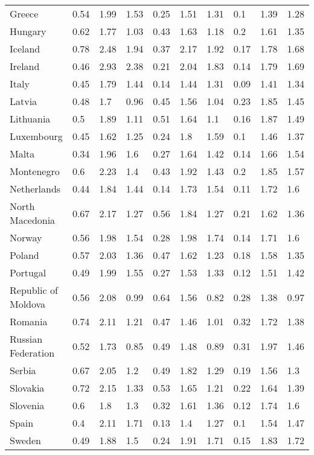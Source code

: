 \begin{longtable}[t]{llllllllll}
Greece & 0.54 & 1.99 & 1.53 & 0.25 & 1.51 & 1.31 & 0.1 & 1.39 & 1.28\\
Hungary & 0.62 & 1.77 & 1.03 & 0.43 & 1.63 & 1.18 & 0.2 & 1.61 & 1.35\\
Iceland & 0.78 & 2.48 & 1.94 & 0.37 & 2.17 & 1.92 & 0.17 & 1.78 & 1.68\\
Ireland & 0.46 & 2.93 & 2.38 & 0.21 & 2.04 & 1.83 & 0.14 & 1.79 & 1.69\\
Italy & 0.45 & 1.79 & 1.44 & 0.14 & 1.44 & 1.31 & 0.09 & 1.41 & 1.34\\
Latvia & 0.48 & 1.7 & 0.96 & 0.45 & 1.56 & 1.04 & 0.23 & 1.85 & 1.45\\
Lithuania & 0.5 & 1.89 & 1.11 & 0.51 & 1.64 & 1.1 & 0.16 & 1.87 & 1.49\\
Luxembourg & 0.45 & 1.62 & 1.25 & 0.24 & 1.8 & 1.59 & 0.1 & 1.46 & 1.37\\
Malta & 0.34 & 1.96 & 1.6 & 0.27 & 1.64 & 1.42 & 0.14 & 1.66 & 1.54\\
Montenegro & 0.6 & 2.23 & 1.4 & 0.43 & 1.92 & 1.43 & 0.2 & 1.85 & 1.57\\
Netherlands & 0.44 & 1.84 & 1.44 & 0.14 & 1.73 & 1.54 & 0.11 & 1.72 & 1.6\\
North Macedonia & 0.67 & 2.17 & 1.27 & 0.56 & 1.84 & 1.27 & 0.21 & 1.62 & 1.36\\
Norway & 0.56 & 1.98 & 1.54 & 0.28 & 1.98 & 1.74 & 0.14 & 1.71 & 1.6\\
Poland & 0.57 & 2.03 & 1.36 & 0.47 & 1.62 & 1.23 & 0.18 & 1.58 & 1.35\\
Portugal & 0.49 & 1.99 & 1.55 & 0.27 & 1.53 & 1.33 & 0.12 & 1.51 & 1.42\\
Republic of Moldova & 0.56 & 2.08 & 0.99 & 0.64 & 1.56 & 0.82 & 0.28 & 1.38 & 0.97\\
Romania & 0.74 & 2.11 & 1.21 & 0.47 & 1.46 & 1.01 & 0.32 & 1.72 & 1.38\\
Russian Federation & 0.52 & 1.73 & 0.85 & 0.49 & 1.48 & 0.89 & 0.31 & 1.97 & 1.46\\
Serbia & 0.67 & 2.05 & 1.2 & 0.49 & 1.82 & 1.29 & 0.19 & 1.56 & 1.3\\
Slovakia & 0.72 & 2.15 & 1.33 & 0.53 & 1.65 & 1.21 & 0.22 & 1.64 & 1.39\\
Slovenia & 0.6 & 1.8 & 1.3 & 0.32 & 1.61 & 1.36 & 0.12 & 1.74 & 1.6\\
Spain & 0.4 & 2.11 & 1.71 & 0.13 & 1.4 & 1.27 & 0.1 & 1.54 & 1.47\\
Sweden & 0.49 & 1.88 & 1.5 & 0.24 & 1.91 & 1.71 & 0.15 & 1.83 & 1.72\\

\end{longtable}
